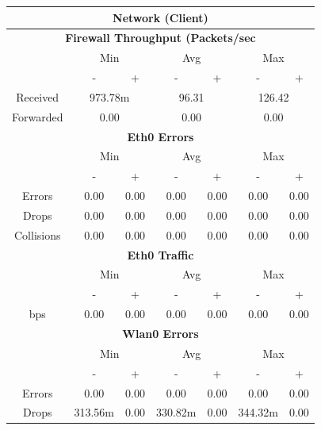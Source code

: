 \documentclass[11pt,a4paper,headinclude=false,footinclude=false]{scrreprt}
\begin{document}
\begin{table}[H]
\centering
    \begin{tabular}{||c|c|c|c|c|c|c||}
    \hline
    \multicolumn{7}{|c|}{\textbf{Network (Client)}} \\
    \hline
    \multicolumn{7}{|c|}{\textbf{Firewall Throughput (Packets/sec}} \\
    \hline\hline
      & \multicolumn{2}{|c|}{Min} & \multicolumn{2}{|c|}{Avg} & \multicolumn{2}{|c|}{Max} \\
    \hline\hline
      & - & + & - & + & - & + \\
    \hline
    Received & \multicolumn{2}{|c|}{973.78m} & \multicolumn{2}{|c|}{96.31} & \multicolumn{2}{|c|}{126.42} \\
    \hline
    Forwarded & \multicolumn{2}{|c|}{0.00} & \multicolumn{2}{|c|}{0.00} & \multicolumn{2}{|c|}{0.00} \\
    \hline\hline
    \multicolumn{7}{|c|}{\textbf{Eth0 Errors}} \\
    \hline\hline
      & \multicolumn{2}{|c|}{Min} & \multicolumn{2}{|c|}{Avg} & \multicolumn{2}{|c|}{Max} \\
    \hline
     & - & + & - & + & - & + \\
    \hline
    Errors & 0.00 & 0.00 & 0.00 & 0.00 & 0.00 & 0.00 \\
    \hline
    Drops & 0.00 & 0.00 & 0.00 & 0.00 & 0.00 & 0.00 \\
    \hline
    Collisions & 0.00 & 0.00 & 0.00 & 0.00 & 0.00 & 0.00 \\
    \hline\hline
    \multicolumn{7}{|c|}{\textbf{Eth0 Traffic}} \\
    \hline\hline
      & \multicolumn{2}{|c|}{Min} & \multicolumn{2}{|c|}{Avg} & \multicolumn{2}{|c|}{Max} \\
    \hline
      & - & + & - & + & - & + \\
    \hline
    bps & 0.00 & 0.00 & 0.00 & 0.00 & 0.00 & 0.00 \\
    \hline\hline
    \multicolumn{7}{|c|}{\textbf{Wlan0 Errors}} \\
    \hline\hline
      & \multicolumn{2}{|c|}{Min} & \multicolumn{2}{|c|}{Avg} & \multicolumn{2}{|c|}{Max} \\
    \hline
      & - & + & - & + & - & + \\
    \hline
    Errors  & 0.00 & 0.00 & 0.00 & 0.00 & 0.00 & 0.00 \\
    \hline
    Drops & 313.56m & 0.00 & 330.82m & 0.00 & 344.32m & 0.00 \\

\end{tabular}
\end{table}
\end{document}
